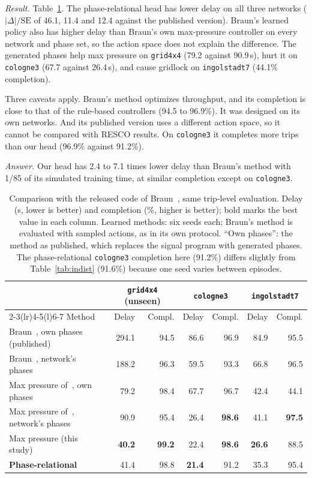 \documentclass[conference]{IEEEtran}
\begin{document}
\emph{Result.} Table~\ref{tab:braun}. The phase-relational head has lower delay on all
three networks ($|\Delta|/\mathrm{SE}$ of 46.1, 11.4 and 12.4 against the published
version). Braun's learned policy also has higher delay than Braun's own max-pressure
controller on every network and phase set, so the action space does not explain the
difference. The generated phases help max pressure on \texttt{grid4x4} (79.2 against
90.9\,s), hurt it on \texttt{cologne3} (67.7 against 26.4\,s), and cause gridlock on
\texttt{ingolstadt7} (44.1\% completion).

Three caveats apply. Braun's method optimizes throughput, and its completion is close to
that of the rule-based controllers (94.5 to 96.9\%). It was designed on its own networks.
And its published version uses a different action space, so it cannot be compared with
RESCO results. On \texttt{cologne3} it completes more trips than our head (96.9\% against
91.2\%).

\emph{Answer.} Our head has 2.4 to 7.1 times lower delay than Braun's method with 1/85 of
its simulated training time, at similar completion except on \texttt{cologne3}.

\begin{table}[t]
\caption{Comparison with the released code of Braun~\cite{graphiface}, same trip-level
evaluation. Delay (s, lower is better) and completion (\%, higher is better); bold marks
the best value in each column. Learned methods: six seeds each; Braun's method is evaluated
with sampled actions, as in its own protocol. ``Own phases'': the method as published,
which replaces the signal program with generated phases. The phase-relational
\texttt{cologne3} completion here (91.2\%) differs slightly from Table~\ref{tab:indist}
(91.6\%) because one seed varies between episodes.}
\label{tab:braun}
\centering\footnotesize
\begin{tabular}{@{}lrrrrrr@{}}
\toprule
 & \multicolumn{2}{c}{\texttt{grid4x4} (unseen)} & \multicolumn{2}{c}{\texttt{cologne3}} & \multicolumn{2}{c}{\texttt{ingolstadt7}} \\
\cmidrule(lr){2-3}\cmidrule(lr){4-5}\cmidrule(l){6-7}
Method & Delay & Compl. & Delay & Compl. & Delay & Compl. \\
\midrule
Braun~\cite{graphiface}, own phases (published) & 294.1 & 94.5 & 86.6 & 96.9 & 84.9 & 95.5 \\
Braun~\cite{graphiface}, network's phases & 188.2 & 96.3 & 59.5 & 93.3 & 66.8 & 96.5 \\
Max pressure of~\cite{graphiface}, own phases & 79.2 & 98.4 & 67.7 & 96.7 & 42.4 & 44.1 \\
Max pressure of~\cite{graphiface}, network's phases & 90.9 & 95.4 & 26.4 & \textbf{98.6} & 41.1 & \textbf{97.5} \\
Max pressure (this study) & \textbf{40.2} & \textbf{99.2} & 22.4 & \textbf{98.6} & \textbf{26.6} & 88.5 \\
\textbf{Phase-relational} & 41.4 & 98.8 & \textbf{21.4} & 91.2 & 35.3 & 95.4 \\
\bottomrule
\end{tabular}
\end{table}
\end{document}
